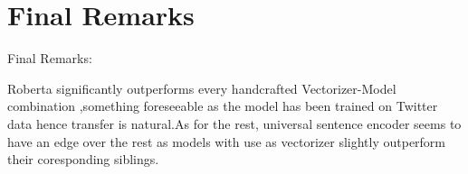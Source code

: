 \documentclass[12pt]{beamer}
\begin{document}
\section{Final Remarks}
\begin{frame}{Final Remarks:}

Roberta significantly outperforms every handcrafted Vectorizer-Model combination ,something foreseeable  as the model has been trained on Twitter data hence transfer is natural.As for the rest, universal sentence encoder seems to have an edge over the rest as models with use as vectorizer slightly outperform their coresponding siblings.
  \end{frame}
\end{document}

